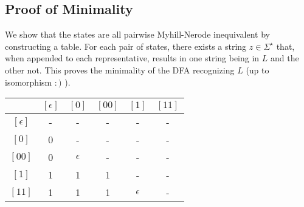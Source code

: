 \subsection*{Proof of Minimality}
We show that the states are all pairwise Myhill-Nerode inequivalent by constructing a table. For each pair of states, there exists a string \( z \in \Sigma^\star \) that, when appended to each representative, results in one string being in \( L \) and the other not. This proves the minimality of the DFA recognizing \( L \) (up to isomorphism $:)$ ).

\begin{center}
\begin{tabular}{|c|c|c|c|c|c|}
    \hline
    & \([\epsilon]\) & \([0]\) & \([00]\) & \([1]\) & \([11]\) \\
    \hline
    \([\epsilon]\) & - & - & - & - & - \\
    \hline
    \([0]\) & 0 & - & - & - & - \\
    \hline
    \([00]\) & 0 & \( \epsilon \) & - & - & - \\
    \hline
    \([1]\) & 1 & 1 & 1 & - & - \\
    \hline
    \([11]\) & 1 & 1 & 1 & \( \epsilon \) & - \\
    \hline
\end{tabular}
\end{center}


